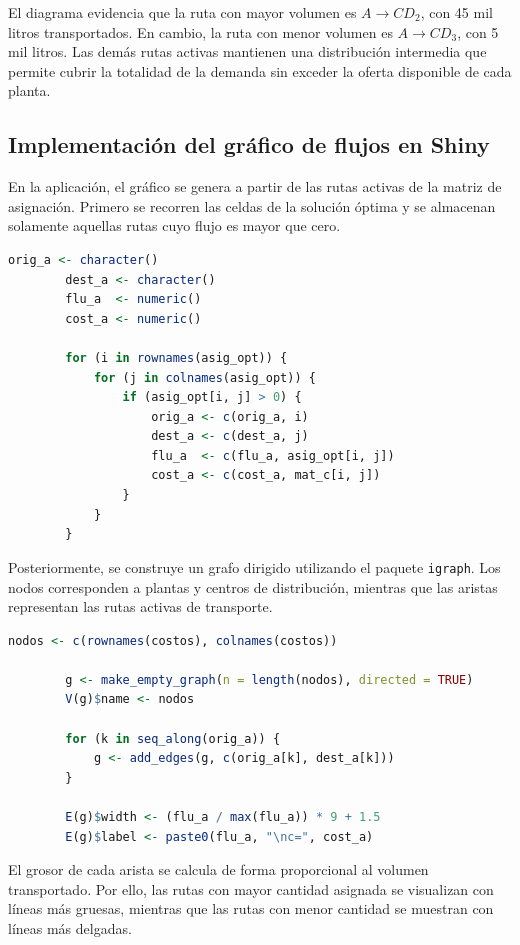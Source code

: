 \documentclass{article}
\begin{document}
	El diagrama evidencia que la ruta con mayor volumen es $A \rightarrow CD_2$, con 45 mil
	litros transportados. En cambio, la ruta con menor volumen es $A \rightarrow CD_3$, con
	5 mil litros. Las demás rutas activas mantienen una distribución intermedia que permite
	cubrir la totalidad de la demanda sin exceder la oferta disponible de cada planta.
	
	\subsection{Implementación del gráfico de flujos en Shiny}
	
	En la aplicación, el gráfico se genera a partir de las rutas activas de la matriz de
	asignación. Primero se recorren las celdas de la solución óptima y se almacenan solamente
	aquellas rutas cuyo flujo es mayor que cero.
	
	\begin{lstlisting}[language=R, caption={Extraccion de rutas activas}]
		orig_a <- character()
		dest_a <- character()
		flu_a  <- numeric()
		cost_a <- numeric()
		
		for (i in rownames(asig_opt)) {
			for (j in colnames(asig_opt)) {
				if (asig_opt[i, j] > 0) {
					orig_a <- c(orig_a, i)
					dest_a <- c(dest_a, j)
					flu_a  <- c(flu_a, asig_opt[i, j])
					cost_a <- c(cost_a, mat_c[i, j])
				}
			}
		}
	\end{lstlisting}
	
	Posteriormente, se construye un grafo dirigido utilizando el paquete \texttt{igraph}. Los
	nodos corresponden a plantas y centros de distribución, mientras que las aristas
	representan las rutas activas de transporte.
	
	\begin{lstlisting}[language=R, caption={Construccion del grafo de flujos}]
		nodos <- c(rownames(costos), colnames(costos))
		
		g <- make_empty_graph(n = length(nodos), directed = TRUE)
		V(g)$name <- nodos
		
		for (k in seq_along(orig_a)) {
			g <- add_edges(g, c(orig_a[k], dest_a[k]))
		}
		
		E(g)$width <- (flu_a / max(flu_a)) * 9 + 1.5
		E(g)$label <- paste0(flu_a, "\nc=", cost_a)
	\end{lstlisting}
	
	El grosor de cada arista se calcula de forma proporcional al volumen transportado. Por
	ello, las rutas con mayor cantidad asignada se visualizan con líneas más gruesas,
	mientras que las rutas con menor cantidad se muestran con líneas más delgadas.
	
\end{document}
